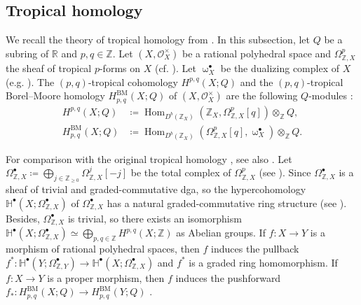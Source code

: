 \documentclass[a4paper,dvipdfmx,reqno,12pt]{amsart}
\theoremstyle{definition}
\newcommand{\deq}{\coloneqq}
\newcommand{\opn}[1]{\operatorname{#1}}
\numberwithin{equation}{section}
\begin{document}
\subsection{Tropical homology}
We recall
the theory of tropical homology from
\cite{MR3330789,MR3894860,MR4637248}.
In this subsection, let
$Q$ be a subring of $\mathbb{R}$
and $p,q\in \mathbb{Z}$.
Let $(X,\mathcal{O}_X^{\times})$ be
a rational polyhedral space and 
$\Omega_{\mathbb{Z},X}^{p}$
the sheaf of tropical $p$-forms
on $X$ \cite[Definition 2.7]{MR4637248}
(cf. \cite[]{MR3330789}).
Let $\upomega_{X}^{\bullet}$ be
the dualizing complex of $X$
(e.g. \cite[Definition 3.1.16]{MR1299726}).
The $(p,q)$-tropical cohomology
$H^{p,q}(X;Q)$ and 
the $(p,q)$-tropical Borel--Moore homology
$H_{p,q}^{\mathrm{BM}}(X;Q)$ of
$(X,\mathcal{O}_X^{\times})$
are the following $Q$-modules
\cite[Definition 4.1 and 4.3]{MR4637248}:
\begin{align}
H^{p,q}(X;Q)&\deq \opn{Hom}_{D^{b}(\mathbb{Z}_X)}(
\mathbb{Z}_X,\Omega_{\mathbb{Z},X}^{p}[q])
\otimes_{\mathbb{Z}} Q, \\
H_{p,q}^{\mathrm{BM}}(X;Q)
&\deq \opn{Hom}_{D^{b}(\mathbb{Z}_X)}
(\Omega_{\mathbb{Z},X}^{p}[q],\upomega_{X}^{\bullet})
\otimes_{\mathbb{Z}}Q.
\end{align}

For comparison with the original
tropical homology \cite{MR3330789,MR3961331},
see also \cite[Remark 2.8 and Theorem 4.20]{MR4637248}.
Let $\Omega_{\mathbb{Z},X}^{\bullet}
\deq \bigoplus_{j\in \mathbb{Z}_{\geq 0}}
\Omega_{\mathbb{Z},X}^{j}[-j]$ 
be the total complex of 
$\Omega_{\mathbb{Z},X}^{p}$ 
(see \cite[Proposition 3.1]{smacka2017differential}).
Since $\Omega_{\mathbb{Z},X}^{\bullet}$ is a sheaf
of trivial and graded-commutative dga, so the
hypercohomology 
$\mathbb{H}^{\bullet}(X;\Omega_{\mathbb{Z},X}^{\bullet})$
of $\Omega_{\mathbb{Z},X}^{\bullet}$ has
a natural graded-commutative ring structure
(see \cite[Remark 21.130]{gortzwedhorn2023}).
Besides, $\Omega_{\mathbb{Z},X}^{\bullet}$ is trivial,
so there exists an isomorphism
$\mathbb{H}^{\bullet}(X;\Omega_{\mathbb{Z},X}^{\bullet})
\simeq \bigoplus_{p,q\in \mathbb{Z}}
H^{p,q}(X;\mathbb{Z})$ as Abelian groups.
If $f\colon X\to Y$ is a morphism of
rational polyhedral spaces, then
$f$ induces the pullback
$f^{*}\colon \mathbb{H}^{\bullet}(Y;\Omega_{\mathbb{Z},Y}^{\bullet})
\to \mathbb{H}^{\bullet}(X;\Omega_{\mathbb{Z},X}^{\bullet})$
\cite[Proposition 4.18]{MR4637248} and $f^{*}$ is
a graded ring homomorphism.
If $f\colon X\to Y$ is a proper morphism, then
$f$ induces the pushforward 
$f_*\colon H^{\opn{BM}}_{p,q}(X;Q)\to 
H^{\opn{BM}}_{p,q}(Y;Q)$ \cite[Definition 4.9]{MR4637248}.
\end{document}
